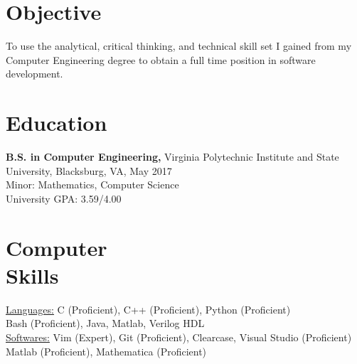 \documentclass[margin]{res}
\begin{document}
 
 

\address{} %
\address{8 Russell Ave Unit 410 \\ Gaithersburg, MD 20877 \\
        (540) 835-8657 \\ shengw12@vt.edu } %
 
\begin{resume} %

\section{Objective}
To use the analytical, critical thinking, and technical skill set I gained from my 
Computer Engineering degree to obtain a full time position in software development.

\section{Education} 
{\bf B.S. in Computer Engineering,} Virginia Polytechnic Institute and State University, Blacksburg, VA, May 2017 \\ Minor: Mathematics, Computer Science \\
University GPA: 3.59/4.00

\section{Computer \\ Skills}
\underline{Languages:}  C (Proficient), C++ (Proficient), Python (Proficient) \\ Bash (Proficient), Java, Matlab, Verilog HDL \\ 
\underline{Softwares:}  Vim (Expert), Git (Proficient), Clearcase, Visual Studio (Proficient) \\
     					    Matlab (Proficient), Mathematica (Proficient)
 

\end{resume}
\end{document}
